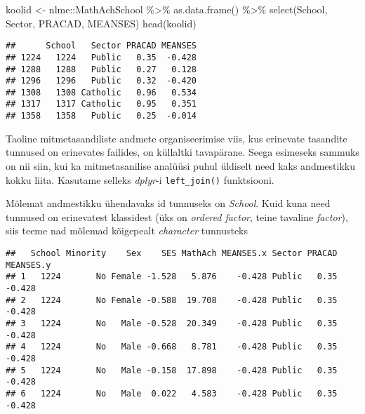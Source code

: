 \documentclass[
]{book}
\newenvironment{Shaded}{\begin{snugshade}}{\end{snugshade}}
\newcommand{\AttributeTok}[1]{\textcolor[rgb]{0.77,0.63,0.00}{#1}}
\newcommand{\CommentTok}[1]{\textcolor[rgb]{0.56,0.35,0.01}{\textit{#1}}}
\newcommand{\FunctionTok}[1]{\textcolor[rgb]{0.00,0.00,0.00}{#1}}
\newcommand{\NormalTok}[1]{#1}
\newcommand{\OtherTok}[1]{\textcolor[rgb]{0.56,0.35,0.01}{#1}}
\newcommand{\SpecialCharTok}[1]{\textcolor[rgb]{0.00,0.00,0.00}{#1}}
\newcommand{\StringTok}[1]{\textcolor[rgb]{0.31,0.60,0.02}{#1}}
\begin{document}
\begin{Shaded}
\begin{Highlighting}[]
\NormalTok{koolid }\OtherTok{\textless{}{-}}\NormalTok{ nlme}\SpecialCharTok{::}\NormalTok{MathAchSchool }\SpecialCharTok{\%\textgreater{}\%} 
  \FunctionTok{as.data.frame}\NormalTok{() }\SpecialCharTok{\%\textgreater{}\%} 
  \FunctionTok{select}\NormalTok{(School, Sector, PRACAD, MEANSES)}
\FunctionTok{head}\NormalTok{(koolid)}
\end{Highlighting}
\end{Shaded}

\begin{verbatim}
##      School   Sector PRACAD MEANSES
## 1224   1224   Public   0.35  -0.428
## 1288   1288   Public   0.27   0.128
## 1296   1296   Public   0.32  -0.420
## 1308   1308 Catholic   0.96   0.534
## 1317   1317 Catholic   0.95   0.351
## 1358   1358   Public   0.25  -0.014
\end{verbatim}

Taoline mitmetasandiliste andmete organiseerimise viis, kus erinevate tasandite tunnused on erinevates failides, on küllaltki tavapärane. Seega esimeseks sammuks on nii siin, kui ka mitmetasanilise analüüsi puhul üldiselt need kaks andmestikku kokku liita. Kasutame selleks \emph{dplyr}-i \texttt{left\_join()} funktsiooni.

Mõlemat andmestikku ühendavaks id tunnuseks on \emph{School}. Kuid kuna need tunnused on erinevatest klassidest (üks on \emph{ordered factor}, teine tavaline \emph{factor}), siis teeme nad mõlemad kõigepealt \emph{character} tunnusteks

\begin{Shaded}
\end{Shaded}

\begin{verbatim}
##   School Minority    Sex    SES MathAch MEANSES.x Sector PRACAD MEANSES.y
## 1   1224       No Female -1.528   5.876    -0.428 Public   0.35    -0.428
## 2   1224       No Female -0.588  19.708    -0.428 Public   0.35    -0.428
## 3   1224       No   Male -0.528  20.349    -0.428 Public   0.35    -0.428
## 4   1224       No   Male -0.668   8.781    -0.428 Public   0.35    -0.428
## 5   1224       No   Male -0.158  17.898    -0.428 Public   0.35    -0.428
## 6   1224       No   Male  0.022   4.583    -0.428 Public   0.35    -0.428
\end{verbatim}
\end{document}
